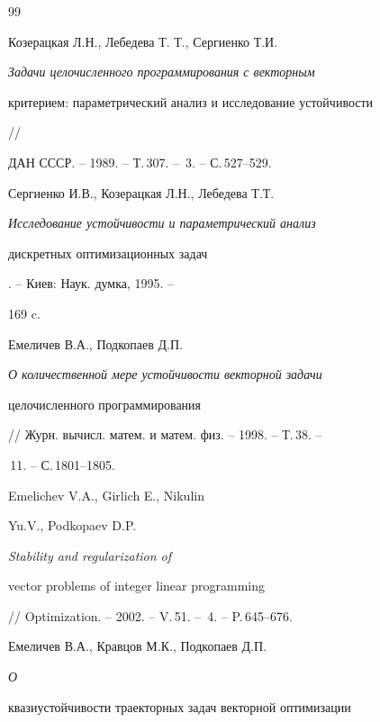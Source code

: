 \begin{thebibliography}{99}










Козерацкая Л.Н., Лебедева Т. Т., Сергиенко Т.И.


{\em Задачи целочисленного программирования с векторным


критерием: параметрический анализ и исследование устойчивости} //


ДАН СССР. -- 1989. -- Т.\,307. -- \No\,3. -- С.\,527--529.







Сергиенко И.В., Козерацкая Л.Н., Лебедева Т.Т.


{\em Исследование устойчивости и параметрический анализ


дискретных оптимизационных задач}. -- Киев: Наук. думка, 1995. --


169 c.







Емеличев В.А., Подкопаев Д.П.


{\em О количественной мере устойчивости векторной задачи


целочисленного программирования}


// Журн. вычисл. матем. и матем. физ. -- 1998. -- Т.\,38. --


\No\,11. -- С.\,1801--1805.







Emelichev V.A., Girlich E., Nikulin


Yu.V., Podkopaev D.P. {\em Stability and regularization of


vector problems of integer linear programming}


// Optimization. -- 2002. -- V.\,51. -- \No\,4. -- P.\,645--676.







Емеличев В.А., Кравцов М.К., Подкопаев Д.П. {\em О


квазиустойчивости траекторных задач векторной оптимизации}



\end{thebibliography}
